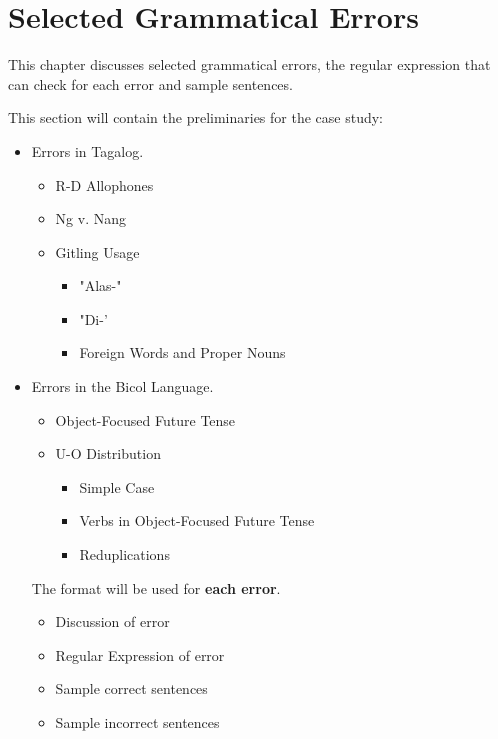 \chapter{Selected Grammatical Errors}
This chapter discusses selected grammatical errors, the regular expression that can check for each error and sample sentences.

      {\color{blue}
            This section will contain the preliminaries for the case study:

            \begin{itemize}
                  \item Errors in Tagalog.
                        \begin{itemize}
                              \item R-D Allophones
                              \item Ng v. Nang
                              \item Gitling Usage
                                    \begin{itemize}
                                          \item "Alas-"
                                          \item "Di-'
                                          \item Foreign Words and Proper Nouns
                                    \end{itemize}
                        \end{itemize}
                  \item Errors in the Bicol Language.
                        \begin{itemize}
                              \item Object-Focused Future Tense
                              \item U-O Distribution
                                    \begin{itemize}
                                          \item Simple Case
                                          \item Verbs in Object-Focused Future Tense
                                          \item Reduplications
                                    \end{itemize}
                        \end{itemize}

                        The format will be used for \textbf{each error}.
                        \begin{itemize}
                              \item Discussion of error
                              \item Regular Expression of error
                              \item Sample correct sentences
                              \item Sample incorrect sentences
                        \end{itemize}
            \end{itemize}
      }

